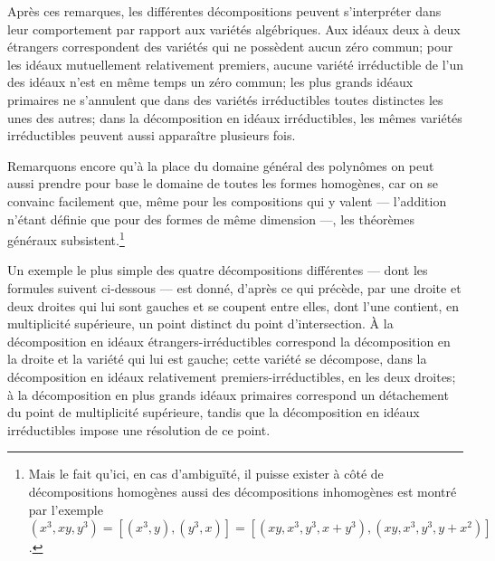 Après ces remarques, les différentes décompositions peuvent s'interpréter dans leur comportement par rapport aux variétés algébriques. Aux idéaux deux à deux étrangers correspondent des variétés qui ne possèdent aucun zéro commun; pour les idéaux mutuellement relativement premiers, aucune variété irréductible de l'un des idéaux n'est en même temps un zéro commun; les plus grands idéaux primaires ne s'annulent que dans des variétés irréductibles toutes distinctes les unes des autres; dans la décomposition en idéaux irréductibles, les mêmes variétés irréductibles peuvent aussi apparaître plusieurs fois.

Remarquons encore qu'à la place du domaine général des polynômes on peut aussi prendre pour base le domaine de toutes les formes homogènes, car on se convainc facilement que, même pour les compositions qui y valent --- l'addition n'étant définie que pour des formes de même dimension ---, les théorèmes généraux subsistent.\footnote{Mais le fait qu'ici, en cas d'ambiguïté, il puisse exister à côté de décompositions homogènes aussi des décompositions inhomogènes est montré par l'exemple $ (x^3,xy,y^3)=[(x^3,y),(y^3,x)]=[(xy,x^3,y^3,x+y^3),(xy,x^3,y^3,y+x^2)]$.}

Un exemple le plus simple des quatre décompositions différentes --- dont les formules suivent ci-dessous --- est donné, d'après ce qui précède, par une droite et deux droites qui lui sont gauches et se coupent entre elles, dont l'une contient, en multiplicité supérieure, un point distinct du point d'intersection. À la décomposition en idéaux étrangers-irréductibles correspond la décomposition en la droite et la variété qui lui est gauche; cette variété se décompose, dans la décomposition en idéaux relativement premiers-irréductibles, en les deux droites; à la décomposition en plus grands idéaux primaires correspond un détachement du point de multiplicité supérieure, tandis que la décomposition en idéaux irréductibles impose une résolution de ce point.

